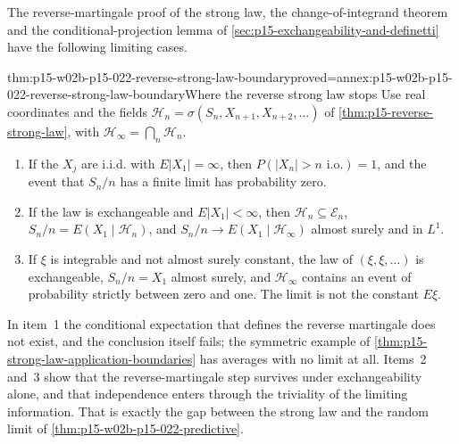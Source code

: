 The reverse-martingale proof of the strong law, the change-of-integrand
theorem and the conditional-projection lemma of
\cref{sec:p15-exchangeability-and-definetti} have the following limiting
cases.

\begin{hbtheorem}{thm:p15-w02b-p15-022-reverse-strong-law-boundary}{proved=annex:p15-w02b-p15-022-reverse-strong-law-boundary}{Where the reverse strong law stops}
Use real coordinates and the fields
\(\mathcal H_n=\sigma(S_n,X_{n+1},X_{n+2},\ldots)\) of
\cref{thm:p15-reverse-strong-law}, with
\(\mathcal H_\infty=\bigcap_n\mathcal H_n\).
\begin{enumerate}
\item If the \(X_j\) are i.i.d. with \(E|X_1|=\infty\), then
      \(P(|X_n|>n\text{ i.o.})=1\), and the event that \(S_n/n\) has a finite
      limit has probability zero.
\item If the law is exchangeable and \(E|X_1|<\infty\), then
      \(\mathcal H_n\subseteq\mathcal E_n\),
      \(S_n/n=E(X_1\mid\mathcal H_n)\), and
      \(S_n/n\to E(X_1\mid\mathcal H_\infty)\) almost surely and in \(L^1\).
\item If \(\xi\) is integrable and not almost surely constant, the law of
      \((\xi,\xi,\ldots)\) is exchangeable, \(S_n/n=X_1\) almost surely, and
      \(\mathcal H_\infty\) contains an event of probability strictly
      between zero and one. The limit is not the constant \(E\xi\).
\end{enumerate}
\end{hbtheorem}

In item~1 the conditional expectation that defines the reverse martingale
does not exist, and the conclusion itself fails; the symmetric example of
\cref{thm:p15-strong-law-application-boundaries} has averages with no limit
at all. Items~2 and~3 show that the reverse-martingale step survives under
exchangeability alone, and that independence enters through the triviality
of the limiting information. That is exactly the gap between the strong law
and the random limit of \cref{thm:p15-w02b-p15-022-predictive}.

